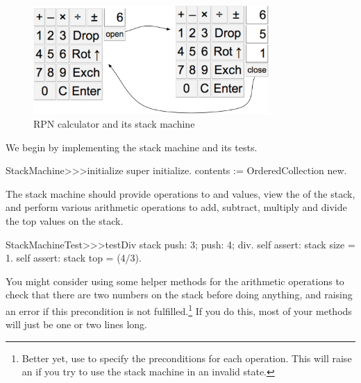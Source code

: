 \documentclass[a4paper,10pt,twoside]{book}
\begin{document}
\begin{figure}[ht]
\begin{center}
\includegraphics[width=0.8\textwidth]{stackMachine}
\caption{RPN calculator and its stack machine}
\label{fig:stackMachine}
\end{center}
\end{figure}

We begin by implementing the stack machine and its tests.


\begin{code}{}
StackMachine>>>initialize
	super initialize.
	contents := OrderedCollection new.
\end{code}

The stack machine should provide operations to  and  values, view the  of the stack, and perform various arithmetic operations to add, subtract, multiply and divide the top values on the stack.


\begin{code}{}
StackMachineTest>>>testDiv
	stack
		push: 3;
		push: 4;
		div.
	self assert: stack size = 1.
	self assert: stack top = (4/3).
\end{code}

You might consider using some helper methods for the arithmetic operations to check that there are two numbers on the stack before doing anything, and raising an error if this precondition is not fulfilled.\footnote{Better yet, use  to specify the preconditions for each operation.
This will raise an  if you try to use the stack machine in an invalid state.}
If you do this, most  of your methods will just be one or two lines long.
\end{document}
